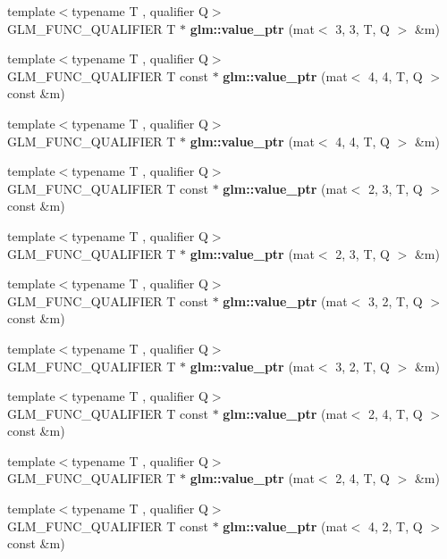\begin{DoxyCompactItemize}
\item 
{\footnotesize template$<$typename T , qualifier Q$>$ }\\G\+L\+M\+\_\+\+F\+U\+N\+C\+\_\+\+Q\+U\+A\+L\+I\+F\+I\+ER T $\ast$ {\bfseries glm\+::value\+\_\+ptr} (mat$<$ 3, 3, T, Q $>$ \&m)
\item 
{\footnotesize template$<$typename T , qualifier Q$>$ }\\G\+L\+M\+\_\+\+F\+U\+N\+C\+\_\+\+Q\+U\+A\+L\+I\+F\+I\+ER T const  $\ast$ {\bfseries glm\+::value\+\_\+ptr} (mat$<$ 4, 4, T, Q $>$ const \&m)
\item 
{\footnotesize template$<$typename T , qualifier Q$>$ }\\G\+L\+M\+\_\+\+F\+U\+N\+C\+\_\+\+Q\+U\+A\+L\+I\+F\+I\+ER T $\ast$ {\bfseries glm\+::value\+\_\+ptr} (mat$<$ 4, 4, T, Q $>$ \&m)
\item 
{\footnotesize template$<$typename T , qualifier Q$>$ }\\G\+L\+M\+\_\+\+F\+U\+N\+C\+\_\+\+Q\+U\+A\+L\+I\+F\+I\+ER T const  $\ast$ {\bfseries glm\+::value\+\_\+ptr} (mat$<$ 2, 3, T, Q $>$ const \&m)
\item 
{\footnotesize template$<$typename T , qualifier Q$>$ }\\G\+L\+M\+\_\+\+F\+U\+N\+C\+\_\+\+Q\+U\+A\+L\+I\+F\+I\+ER T $\ast$ {\bfseries glm\+::value\+\_\+ptr} (mat$<$ 2, 3, T, Q $>$ \&m)
\item 
{\footnotesize template$<$typename T , qualifier Q$>$ }\\G\+L\+M\+\_\+\+F\+U\+N\+C\+\_\+\+Q\+U\+A\+L\+I\+F\+I\+ER T const  $\ast$ {\bfseries glm\+::value\+\_\+ptr} (mat$<$ 3, 2, T, Q $>$ const \&m)
\item 
{\footnotesize template$<$typename T , qualifier Q$>$ }\\G\+L\+M\+\_\+\+F\+U\+N\+C\+\_\+\+Q\+U\+A\+L\+I\+F\+I\+ER T $\ast$ {\bfseries glm\+::value\+\_\+ptr} (mat$<$ 3, 2, T, Q $>$ \&m)
\item 
{\footnotesize template$<$typename T , qualifier Q$>$ }\\G\+L\+M\+\_\+\+F\+U\+N\+C\+\_\+\+Q\+U\+A\+L\+I\+F\+I\+ER T const  $\ast$ {\bfseries glm\+::value\+\_\+ptr} (mat$<$ 2, 4, T, Q $>$ const \&m)
\item 
{\footnotesize template$<$typename T , qualifier Q$>$ }\\G\+L\+M\+\_\+\+F\+U\+N\+C\+\_\+\+Q\+U\+A\+L\+I\+F\+I\+ER T $\ast$ {\bfseries glm\+::value\+\_\+ptr} (mat$<$ 2, 4, T, Q $>$ \&m)
\item 
{\footnotesize template$<$typename T , qualifier Q$>$ }\\G\+L\+M\+\_\+\+F\+U\+N\+C\+\_\+\+Q\+U\+A\+L\+I\+F\+I\+ER T const  $\ast$ {\bfseries glm\+::value\+\_\+ptr} (mat$<$ 4, 2, T, Q $>$ const \&m)

\end{DoxyCompactItemize}
